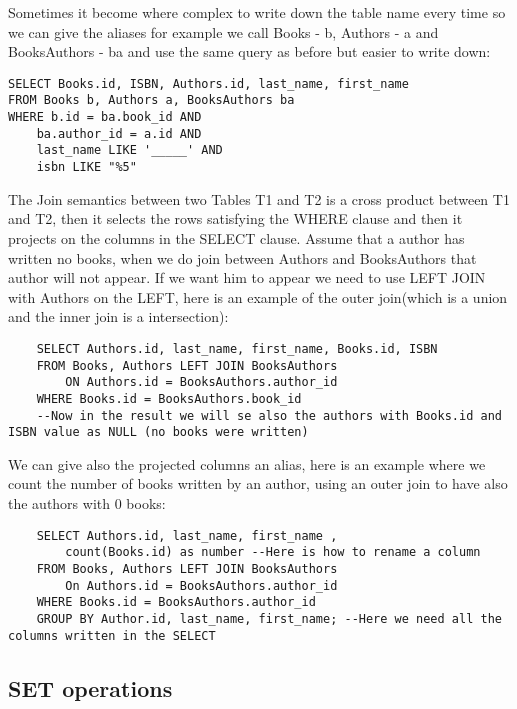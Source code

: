\documentclass[a4page, 11pt]{article}
\begin{document}
Sometimes it become where complex to write down the table name every time so we can give the aliases for example we call Books - b, Authors - a and BooksAuthors - ba and use the same query as before but easier to write down:
\begin{lstlisting}
SELECT Books.id, ISBN, Authors.id, last_name, first_name
FROM Books b, Authors a, BooksAuthors ba
WHERE b.id = ba.book_id AND
	ba.author_id = a.id AND	
	last_name LIKE '_____' AND
	isbn LIKE "%5"
\end{lstlisting}
The Join semantics between two Tables T1 and T2 is a cross product between T1 and T2, then it selects the rows satisfying the WHERE clause and then it projects on the columns in the SELECT clause.\newline
Assume that a author has written no books, when we do join between Authors and BooksAuthors that author will not appear. If we want him to appear we need to use LEFT JOIN with Authors on the LEFT, here is an example of the outer join(which is a union and the inner join is a intersection):
\begin{lstlisting}
	SELECT Authors.id, last_name, first_name, Books.id, ISBN
	FROM Books, Authors LEFT JOIN BooksAuthors
		ON Authors.id = BooksAuthors.author_id
	WHERE Books.id = BooksAuthors.book_id
	--Now in the result we will se also the authors with Books.id and ISBN value as NULL (no books were written)
\end{lstlisting}

We can give also the projected columns an alias, here is an example where we count the number of books written by an author, using an outer join to have also the authors with 0 books:
\begin{lstlisting}
	SELECT Authors.id, last_name, first_name ,
		count(Books.id) as number --Here is how to rename a column
	FROM Books, Authors LEFT JOIN BooksAuthors
		On Authors.id = BooksAuthors.author_id
	WHERE Books.id = BooksAuthors.author_id
	GROUP BY Author.id, last_name, first_name; --Here we need all the columns written in the SELECT
\end{lstlisting}

\subsection{SET operations}
\end{document}
